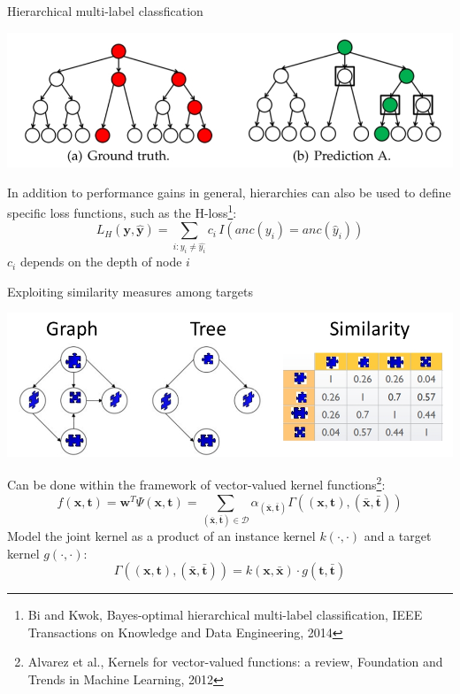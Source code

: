 \documentclass[]{beamer}
\renewcommand{\vec}[1]{\boldsymbol{#1}}
\begin{document}
\begin{frame}{Hierarchical multi-label classfication}

\vspace{-0.2cm}
\begin{center}
\includegraphics[width=\textwidth]{Figures/hloss}
\end{center}

\vspace{-0.2cm}
In addition to performance gains in general, hierarchies can also be used to define specific loss functions, such as the H-loss\footnote{Bi and Kwok, Bayes-optimal hierarchical multi-label classification, IEEE Transactions on Knowledge and Data Engineering, 2014}: 
$$L_H(\vec{y},\hat{\vec{y}}) = \sum_{i: y_i \neq \hat{y_i}} c_i \, I(\textit{anc}(y_i) = \textit{anc}(\hat{y}_i))$$
$c_i$ depends on the depth of node $i$
\end{frame}

\begin{frame}{Exploiting similarity measures among targets}

\begin{center}
\includegraphics[scale=0.3,trim = 600 0 0 90,clip]{pics/targetrelations}
\end{center} 
Can be done within the framework of vector-valued kernel functions\footnote{Alvarez et al., Kernels for vector-valued functions: a review, Foundation and Trends in Machine Learning, 2012}:
\begin{equation*}
\label{eq:pairwise}
f(\vec{x},\vec{t}) = \vec{w}^T \Psi(\vec{x},\vec{t}) = \sum_{(\bar{\vec{x}},\bar{\vec{t}}) \in \mathcal{D}} \alpha_{(\bar{\vec{x}},\bar{\vec{t}})} \Gamma((\vec{x},\vec{t}),(\bar{\vec{x}},\bar{\vec{t}})) 
\end{equation*}
Model the joint kernel as a product of an instance kernel $k(\cdot,\cdot)$ and a target kernel $g(\cdot,\cdot)$: 
$$\Gamma((\vec{x},\vec{t}),(\bar{\vec{x}},\bar{\vec{t}})) = k(\vec{x},\bar{\vec{x}}) \cdot g(\vec{t},\bar{\vec{t}})$$

\end{frame}
\end{document}
